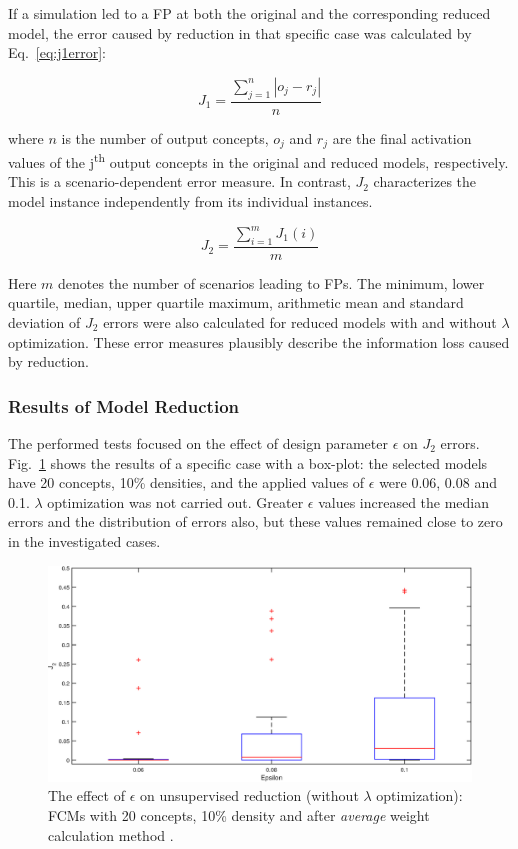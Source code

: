 \documentclass[graybox]{svmult}
\begin{document}
If a simulation led to a FP at both the original and 
the corresponding reduced model, the error caused by reduction in that 
specific case was calculated by Eq.~\ref{eq:j1error}:

\begin{equation}
  \label{eq:j1error}
  J_1 = \frac{\sum_{j=1}^{n} |o_j - r_j|}{n}
\end{equation}

\noindent where $n$ is the number of output concepts, $o_j$ and $r_j$ are the 
final activation values of the j\textsuperscript{th} output concepts in 
the original and reduced models, respectively. This is a 
scenario-dependent error measure. In contrast, $J_2$ characterizes the 
model instance independently from its individual instances.

\begin{equation}
  \label{eq:j2error}
  J_2 = \frac{\sum_{i=1}^{m} J_1(i)}{m}
\end{equation}

Here $m$ denotes the number of scenarios leading to FPs. The minimum, 
lower quartile, median, upper quartile maximum, arithmetic mean and 
standard deviation of $J_2$ errors were also calculated for reduced 
models with and without $\lambda$ optimization. These error measures 
plausibly describe the information loss caused by reduction.

\subsubsection{Results of Model Reduction}
\label{sec:results}

The performed tests focused on the effect of design parameter 
$\epsilon$ on $J_2$ errors. Fig.~\ref{fig:epsilonEffect} shows the 
results of a specific case with a box-plot: the selected models have 20 
concepts, 10\% densities, and the applied values of $\epsilon$ were 
0.06, 0.08 and 0.1. $\lambda$ optimization was not carried out. Greater 
$\epsilon$ values increased the median errors and the distribution of 
errors also, but these values remained close to zero in the 
investigated cases.

\begin{figure}[hbt]
  \includegraphics[width=\textwidth]{j2_unsup_c20_d10.eps}
  \caption{The effect of $\epsilon$ on unsupervised reduction (without 
  $\lambda$ optimization): FCMs with 20 concepts, 10\% density and after 
\emph{average} weight calculation method \cite{hatwagner2018two}.}
  \label{fig:epsilonEffect}
\end{figure}
\end{document}
